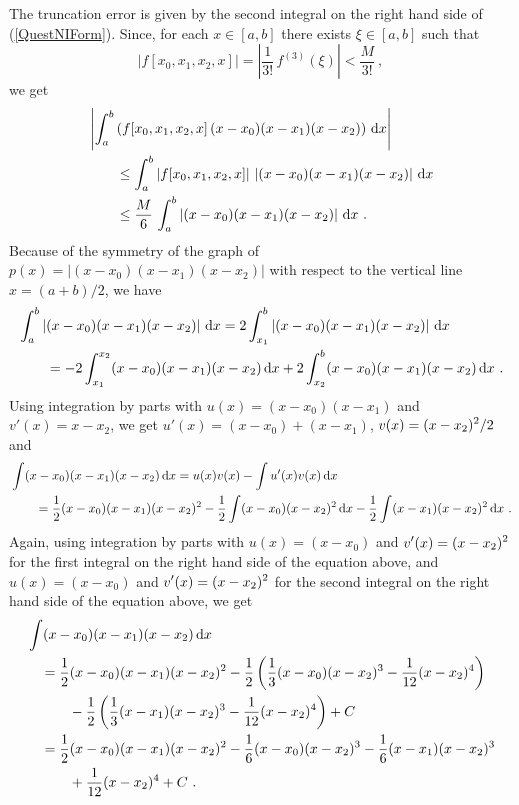 {The truncation error is given by the second integral on the right hand
side of (\ref{QuestNIForm}). Since, for each $x\in [a,b]$ there exists
$\xi\in [a,b]$ such that
\[
\left| f[x_0,x_1,x_2,x] \right| =
\left| \frac{1}{3!}\,f^{(3)}(\xi) \right| < \frac{M}{3!} \ ,
\]
we get
\begin{align*}
&\left| \int_a^b \left(f[x_0,x_1,x_2,x]\,(x-x_0)(x-x_1)(x-x_2)
  \right)\,\mathrm{d}x \right| \\
&\qquad \leq \int_a^b \left|f[x_0,x_1,x_2,x]\right|\,
\left|(x-x_0)(x-x_1)(x-x_2) \right|\,\mathrm{d}x \\
&\qquad \leq \frac{M}{6} \, \int_a^b
\left|(x-x_0)(x-x_1)(x-x_2) \right|\,\mathrm{d}x \ .
\end{align*}
Because of the symmetry of the graph of
$p(x)=|(x-x_0)(x-x_1)(x-x_2)|$ with respect to the vertical line
$x=(a+b)/2$, we have
\begin{align*}
&\int_a^b \left|(x-x_0)(x-x_1)(x-x_2) \right|\,\mathrm{d}x 
= 2\int_{x_1}^b \left|(x-x_0)(x-x_1)(x-x_2) \right|\,\mathrm{d}x \\
&\qquad = - 2\int_{x_1}^{x_2} (x-x_0)(x-x_1)(x-x_2) \,\mathrm{d}x
+ 2\int_{x_2}^b (x-x_0)(x-x_1)(x-x_2) \,\mathrm{d}x \ .
\end{align*}
Using integration by parts with $u(x) = (x-x_0)(x-x_1)$ and
$v'(x) = x-x_2$, we get $u'(x) = (x-x_0) + (x-x_1)$,
$\displaystyle v(x) = (x-x_2)^2/2$ and
\begin{align*}
&\int (x-x_0)(x-x_1)(x-x_2) \,\mathrm{d}x
= u(x)v(x) - \int u'(x) v(x) \,\mathrm{d}x \\  
&\qquad = \frac{1}{2}(x-x_0)(x-x_1)(x-x_2)^2
- \frac{1}{2} \int (x-x_0)(x-x_2)^2\,\mathrm{d}x
- \frac{1}{2} \int (x-x_1)(x-x_2)^2\,\mathrm{d}x \ .
\end{align*}
Again, using integration by parts with $u(x) = (x-x_0)$ and
$\displaystyle v'(x) = (x-x_2)^2$ for the first integral on the right hand side
of the equation above, and $u(x) = (x-x_0)$ and
$\displaystyle v'(x) = (x-x_2)^2$
for the second integral on the right hand side of the equation above,
we get
\begin{align*}
& \int (x-x_0)(x-x_1)(x-x_2) \dx{x} \\
&\quad = \frac{1}{2}(x-x_0)(x-x_1)(x-x_2)^2 - \frac{1}{2}
\left( \frac{1}{3}(x-x_0)(x-x_2)^3 - \frac{1}{12}(x-x_2)^4\right) \\
&\quad\qquad - \frac{1}{2}
\left( \frac{1}{3}(x-x_1)(x-x_2)^3 - \frac{1}{12}(x-x_2)^4\right) + C \\
&\quad= \frac{1}{2}(x-x_0)(x-x_1)(x-x_2)^2 - \frac{1}{6}(x-x_0)(x-x_2)^3
- \frac{1}{6}(x-x_1)(x-x_2)^3 \\
&\quad \qquad + \frac{1}{12}(x-x_2)^4 + C \ .

\end{align*}}
